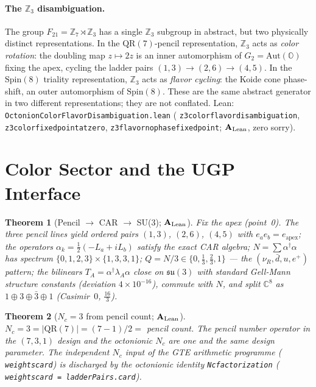 \documentclass[11pt]{article}
\newtheorem{theorem}{Theorem}[section]
\theoremstyle{remark}
\newcommand{\lean}[1]{%
  \penalty-100
  \begingroup\def\_{\textunderscore\allowbreak}\texttt{#1}\endgroup}
\newcommand{\CatAL}{\ensuremath{\textbf{A}_{\rm Lean}}}
\begin{document}
\paragraph{The $\mathbb{Z}_3$ disambiguation.}
The group $F_{21} = \mathbb{Z}_7\!\rtimes\!\mathbb{Z}_3$ has a single
$\mathbb{Z}_3$ subgroup in abstract, but two physically distinct representations.
In the $\mathrm{QR}(7)$-pencil representation, $\mathbb{Z}_3$ acts as
\emph{color rotation}: the doubling map $z \mapsto 2z$ is an inner automorphism
of $G_2 = \mathrm{Aut}(\mathbb{O})$ fixing the apex, cycling the ladder pairs
$(1,3)\to(2,6)\to(4,5)$.
In the $\mathrm{Spin}(8)$ triality representation, $\mathbb{Z}_3$ acts as
\emph{flavor cycling}: the Koide cone phase-shift, an outer automorphism of
$\mathrm{Spin}(8)$.
These are the same abstract generator in two different representations; they
are not conflated.
Lean: \lean{OctonionColorFlavorDisambiguation.lean}
(\lean{z3\_color\_flavor\_disambiguation},
\lean{z3\_color\_fixed\_point\_at\_zero},
\lean{z3\_flavor\_no\_phase\_fixed\_point}; \CatAL, zero sorry).

\section{Color Sector and the UGP Interface}
\label{sec:color}

\begin{theorem}[Pencil $\to$ CAR $\to$ SU(3); \CatAL]
\label{thm:D}
Fix the apex (point~0).
The three pencil lines yield ordered pairs $(1,3)$, $(2,6)$, $(4,5)$ with
$e_a e_b = e_{\mathrm{apex}}$; the operators
$\alpha_k = \tfrac{1}{2}(-L_a + iL_b)$ satisfy the exact CAR algebra;
$N = \sum\alpha^\dagger\alpha$ has spectrum $\{0,1,2,3\}\times\{1,3,3,1\}$;
$Q = N/3\in\{0,\tfrac{1}{3},\tfrac{2}{3},1\}$ --- the $(\nu_R, \bar{d},
u, e^+)$ pattern; the bilinears $T_A = \alpha^\dagger\lambda_A\alpha$ close
on $\mathfrak{su}(3)$ with standard Gell-Mann structure constants
(deviation $4\times10^{-16}$), commute with $N$, and split $\mathbb{C}^8$ as
$1\oplus 3\oplus\bar{3}\oplus 1$ (Casimir~$0$, $\tfrac{16}{3}$).
\end{theorem}

\begin{theorem}[$N_c = 3$ from pencil count; \CatAL]
\label{thm:Dprime}
$N_c = 3 = |\mathrm{QR}(7)| = (7-1)/2 = $ pencil count. The pencil number
operator in the $(7,3,1)$ design and the octonionic $N_c$ are one and the
same design parameter. The independent $N_c$ input of the GTE arithmetic
programme (\lean{weights\_card}) is discharged by the octonionic identity
\lean{Nc\_factorization} (\lean{weights\_card = ladderPairs.card}).
\end{theorem}
\end{document}
